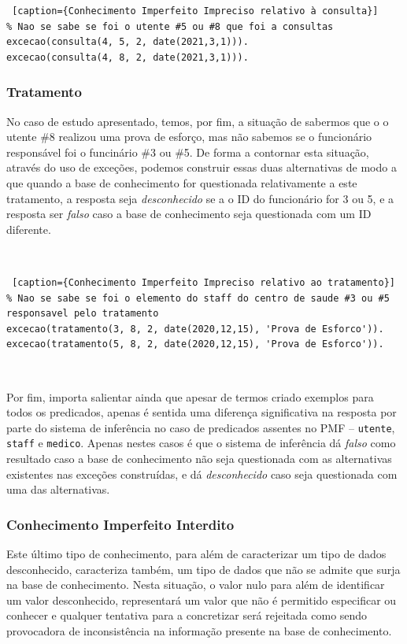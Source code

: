 \documentclass[a4paper, 11pt]{article}
\begin{document}
\begin{lstlisting} [caption={Conhecimento Imperfeito Impreciso relativo à consulta}]
% Nao se sabe se foi o utente #5 ou #8 que foi a consultas
excecao(consulta(4, 5, 2, date(2021,3,1))).
excecao(consulta(4, 8, 2, date(2021,3,1))).
\end{lstlisting}

\subsubsection*{Tratamento}

No caso de estudo apresentado, temos, por fim, a situação de sabermos que o o utente \#8 realizou 
uma prova de esforço, mas não sabemos se o funcionário responsável foi o funcinário \#3 ou 
\#5. De forma a contornar esta situação, através do uso de
exceções, podemos construir essas duas alternativas de modo a que quando a base de
conhecimento for questionada relativamente a este tratamento, a resposta seja \textit{desconhecido} 
se a
o ID do funcionário for 3 ou 5, e a resposta ser \textit{falso} caso a
base de conhecimento seja questionada com um ID diferente.

\

\begin{lstlisting} [caption={Conhecimento Imperfeito Impreciso relativo ao tratamento}]
% Nao se sabe se foi o elemento do staff do centro de saude #3 ou #5 responsavel pelo tratamento
excecao(tratamento(3, 8, 2, date(2020,12,15), 'Prova de Esforco')).
excecao(tratamento(5, 8, 2, date(2020,12,15), 'Prova de Esforco')).
\end{lstlisting}

\

Por fim, importa salientar ainda que apesar de termos criado exemplos para todos os
predicados, apenas é sentida uma diferença significativa na resposta por parte do sistema
de inferência no caso de predicados assentes no PMF -- \texttt{utente}, \texttt{staff} e 
\texttt{medico}. Apenas nestes
casos é que o sistema de inferência dá \textit{falso} como resultado caso a base de
conhecimento não seja questionada com as alternativas existentes nas exceções
construídas, e dá \textit{desconhecido} caso seja questionada com uma das alternativas. 

\subsubsection{Conhecimento Imperfeito Interdito}

Este último tipo de conhecimento, para além de caracterizar um tipo de dados
desconhecido, caracteriza também, um tipo de dados que não se admite que surja na
base de conhecimento.
Nesta situação, o valor nulo para além de identificar um valor desconhecido,
representará um valor que não é permitido especificar ou conhecer e qualquer
tentativa para a concretizar será rejeitada como sendo provocadora de inconsistência
na informação presente na base de conhecimento.
\end{document}
